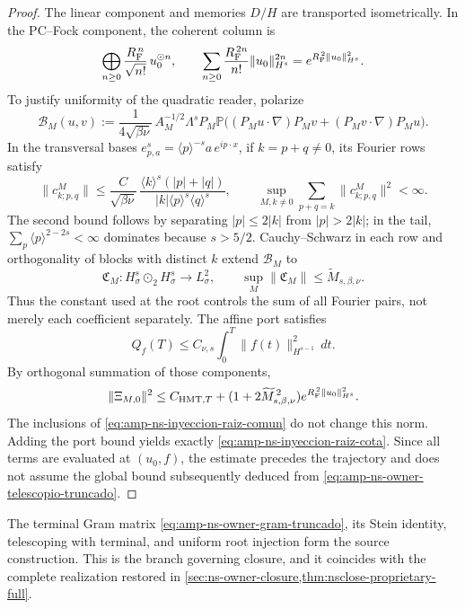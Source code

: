 \begin{proof}
The linear component and memories \(D/H\) are transported isometrically. In the PC--Fock component, the coherent column is
\[
 \bigoplus_{n\geq0}
 \frac{R_{\rm F}^{\,n}}{\sqrt{n!}}\,u_0^{\odot n},
 \qquad
 \sum_{n\geq0}\frac{R_{\rm F}^{\,2n}}{n!}
       \|u_0\|_{H^s}^{2n}
 =e^{R_{\rm F}^{\,2}\|u_0\|_{H^s}^2}.
\]
To justify uniformity of the quadratic reader, polarize
\begin{equation}\label{eq:amp-ns-lector-cuadratico-polarizado}
 \mathcal B_M(u,v):=
 \frac{1}{4\sqrt{\beta\nu}}\,
 A_M^{-1/2}\Lambda^sP_M\mathbb P
 \bigl((P_Mu\!\cdot\!\nabla)P_Mv
      +(P_Mv\!\cdot\!\nabla)P_Mu\bigr).
\end{equation}
In the transversal bases \(e^s_{p,a}=\langle p\rangle^{-s}a\,e^{ip\cdot x}\), if \(k=p+q\ne0\), its Fourier rows satisfy
\begin{equation}\label{eq:amp-ns-filas-fourier-uniformes}
 \|c^M_{k;p,q}\|
 \leq\frac{C}{\sqrt{\beta\nu}}\,
 \frac{\langle k\rangle^s(|p|+|q|)}
 {|k|\langle p\rangle^s\langle q\rangle^s},
 \qquad
 \sup_{M,k\ne0}\sum_{p+q=k}\|c^M_{k;p,q}\|^2<\infty .
\end{equation}
The second bound follows by separating \(|p|\leq2|k|\) from \(|p|>2|k|\); in the tail, \(\sum_p\langle p\rangle^{2-2s}<\infty\) dominates because \(s>5/2\). Cauchy--Schwarz in each row and orthogonality of blocks with distinct \(k\) extend \(\mathcal B_M\) to
\[
 \mathfrak C_M:H^s_\sigma\odot_2H^s_\sigma\longrightarrow L^2_\sigma,
 \qquad
 \sup_M\|\mathfrak C_M\|
 \leq\widetilde M_{s,\beta,\nu}.
\]
Thus the constant used at the root controls the sum of all Fourier pairs, not merely each coefficient separately. The affine port satisfies
\[
 Q_f(T)\leq C_{\nu,s}
 \int_0^T\|f(t)\|_{H^{s-1}}^2\,dt .
\]
By orthogonal summation of those components,
\begin{equation}\label{eq:amp-ns-raiz-cota-por-componentes}
 \|\Xi_{M,0}\|^2
 \leq C_{{\rm HMT},T}
 +(1+2\widetilde M_{s,\beta,\nu}^{\,2})
 e^{R_{\rm F}^{\,2}\|u_0\|_{H^s}^2}.
\end{equation}
The inclusions of \eqref{eq:amp-ns-inyeccion-raiz-comun} do not change this norm. Adding the port bound yields exactly \eqref{eq:amp-ns-inyeccion-raiz-cota}. Since all terms are evaluated at \((u_0,f)\), the estimate precedes the trajectory and does not assume the global bound subsequently deduced from \eqref{eq:amp-ns-owner-telescopio-truncado}.
\end{proof}

The terminal Gram matrix \eqref{eq:amp-ns-owner-gram-truncado}, its Stein identity, telescoping with terminal, and uniform root injection form the source construction. This is the branch governing closure, and it coincides with the complete realization restored in \cref{sec:ns-owner-closure,thm:nsclose-proprietary-full}.

